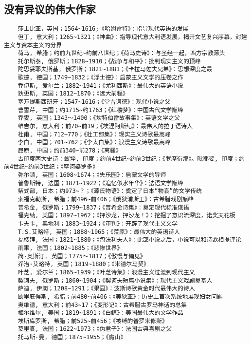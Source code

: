\documentclass[UTF8]{../RepresentationUniverse}
\begin{document}
\subsection{没有异议的伟大作家}
\begin{lstlisting}
    莎士比亚，英国；1564~1616;《哈姆雷特》：指导现代英语的发展
    但丁, 意大利；1265~1321；《神曲》：指导现代意大利语发展，揭开文艺复兴序幕，封建主义与资本主义的分界
    荷马, 希腊；约前九世纪~约前八世纪；《荷马史诗》：与圣经一起，西方宗教源头
    托尔斯泰, 俄罗斯；1828~1910；《战争与和平》：批判现实主义的顶峰
    陀思妥耶夫斯基, 俄罗斯；1821~1881；《卡拉马佐夫兄弟》：思想深度之最
    歌德, 德国；1749~1832；《浮士德》：启蒙主义文学的压卷之作
    乔伊斯, 爱尔兰；1882~1941；《尤利西斯》：最伟大的英语小说
    狄更斯, 英国；1812~1870；《远大前程》
    塞万提斯西班牙；1547~1616；《堂吉诃德》：现代小说之父
    曹雪芹, 中国；约1715~约1763；《红楼梦》：中国古代文学巅峰
    乔叟, 英国；1343～1400；《坎特伯雷故事集》：英语文学之父
    维吉尔, 意大利；前70~前19；《埃涅阿斯纪》：最伟大的拉丁语诗人
    杜甫, 中国；712~770；《杜工部集》：现实主义诗歌最高峰
    李白, 中国；701~762；《李太白集》：浪漫主义诗歌最高峰
    屈原, 中国；约前340~前278；《离骚》
    古印度两大史诗：蚁垤, 印度；约前4世纪~约前3世纪；《罗摩衍那》。毗耶娑, 印度；约前4世纪~约前3世纪；《摩诃婆罗多》
    弥尔顿, 英国；1608~1674；《失乐园》：启蒙文学的导师
    普鲁斯特, 法国；1871~1922；《追忆似水年华》：法语文学巅峰
    紫式部, 日本；约973~？；《源氏物语》：奠定了日本“物哀”的文学传统
    索福克勒斯, 希腊；前496~前406；《俄狄浦斯王》：古希腊戏剧巅峰
    普希金, 俄罗斯；1799~1837；《普希金诗集》：奠定现代标准俄语
    福克纳, 美国；1897~1962；《押沙龙，押沙龙！》：挖掘了意识流深度，诺奖天花板
    卡夫卡, 奥地利；1883~1924；《审判》：开辟了现代主义文学
    T.S.艾略特, 英国；1888~1965；《荒原》：最伟大的英语诗人
    福楼拜, 法国；1821~1880；《包法利夫人》：此部小说之后，小说可以和诗歌相提评论
    雨果, 法国；1802~1885；《悲惨世界》
    简·奥斯汀, 英国；1775～1817；《傲慢与偏见》
    乔治·艾略特, 英国；1819~1880；《米德尔马契》
    叶芝, 爱尔兰；1865~1939；《叶芝诗集》：浪漫主义过渡到现代主义
    契诃夫, 俄罗斯；1860~1904；《契诃夫短篇小说集》：现代主义戏剧奠基人
    萨迪, 伊朗；1208~1291；《果园》：波斯诗歌黄金时代最伟大的诗人
    欧里庇得斯, 希腊；前480~前406；《美狄亚》：历史上首次系统地展现妇女问题
    奥维德, 意大利；前43~17；《变形记》：古希腊古罗马神话的总集
    梅尔维尔, 美国；1819~1891；《白鲸》：美国最伟大的文学作品
    埃斯库罗斯, 希腊；前525~前456；《被缚的普罗米修斯》
    莫里哀, 法国；1622~1973；《伪君子》：法国古典喜剧之父
    托马斯·曼, 德国；1875~1955；《魔山》

\end{lstlisting}
\end{document}
